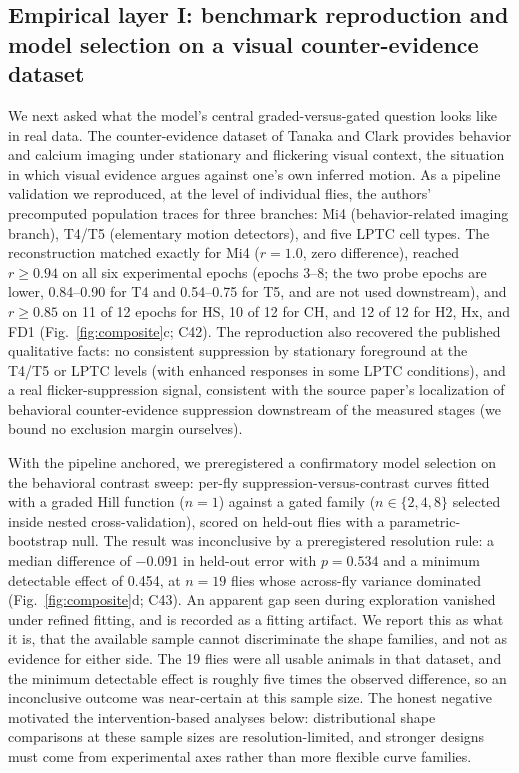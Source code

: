 \documentclass[pdflatex,sn-nature]{sn-jnl}
\begin{document}
\subsection{Empirical layer I: benchmark reproduction and model selection on a visual counter-evidence dataset}

We next asked what the model's central graded-versus-gated question looks like in real data. The counter-evidence dataset of Tanaka and Clark \cite{tanaka2023neural} provides behavior and calcium imaging under stationary and flickering visual context, the situation in which visual evidence argues against one's own inferred motion. As a pipeline validation we reproduced, at the level of individual flies, the authors' precomputed population traces for three branches: Mi4 (behavior-related imaging branch), T4/T5 (elementary motion detectors), and five LPTC cell types. The reconstruction matched exactly for Mi4 ($r=1.0$, zero difference), reached $r\ge 0.94$ on all six experimental epochs (epochs 3--8; the two probe epochs are lower, 0.84--0.90 for T4 and 0.54--0.75 for T5, and are not used downstream), and $r\ge 0.85$ on 11 of 12 epochs for HS, 10 of 12 for CH, and 12 of 12 for H2, Hx, and FD1 (Fig.~\ref{fig:composite}c; C42). The reproduction also recovered the published qualitative facts: no consistent suppression by stationary foreground at the T4/T5 or LPTC levels (with enhanced responses in some LPTC conditions), and a real flicker-suppression signal, consistent with the source paper's localization of behavioral counter-evidence suppression downstream of the measured stages (we bound no exclusion margin ourselves).

With the pipeline anchored, we preregistered a confirmatory model selection on the behavioral contrast sweep: per-fly suppression-versus-contrast curves fitted with a graded Hill function ($n=1$) against a gated family ($n\in\{2,4,8\}$ selected inside nested cross-validation), scored on held-out flies with a parametric-bootstrap null. The result was inconclusive by a preregistered resolution rule: a median difference of $-0.091$ in held-out error with $p=0.534$ and a minimum detectable effect of 0.454, at $n=19$ flies whose across-fly variance dominated (Fig.~\ref{fig:composite}d; C43). An apparent gap seen during exploration vanished under refined fitting, and is recorded as a fitting artifact. We report this as what it is, that the available sample cannot discriminate the shape families, and not as evidence for either side. The 19 flies were all usable animals in that dataset, and the minimum detectable effect is roughly five times the observed difference, so an inconclusive outcome was near-certain at this sample size. The honest negative motivated the intervention-based analyses below: distributional shape comparisons at these sample sizes are resolution-limited, and stronger designs must come from experimental axes rather than more flexible curve families.
\end{document}
